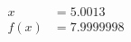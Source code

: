 \documentclass[preview]{standalone}
\begin{document}
\begin{align*}
x &= 5.0013\\f(x) &= 7.9999998
\end{align*}
\end{document}
